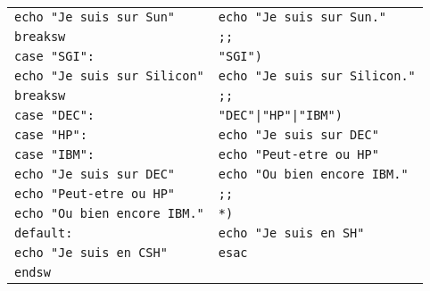 \begin{longtable}{|p{6.5cm}|p{6.5cm}|}
		\hspace{1cm}\verb,echo "Je suis sur Sun",		&
			\hspace{1cm}\verb,echo "Je suis sur Sun.",		\\
		\hspace{1cm}\verb,breaksw,						&
			\hspace{1cm}\verb,;;,							\\
		\hspace{0.5cm}\verb,case "SGI":,				&
			\hspace{0.5cm}\verb,"SGI"),						\\
		\hspace{1cm}\verb,echo "Je suis sur Silicon",	&
			\hspace{1cm}\verb,echo "Je suis sur Silicon.",	\\
		\hspace{1cm}\verb,breaksw,						&
			\hspace{1cm}\verb,;;,							\\
		\hspace{0.5cm}\verb,case "DEC":,				&
			\hspace{0.5cm}\verb,"DEC"|"HP"|"IBM"),			\\
		\hspace{0.5cm}\verb,case "HP":,					&
			\hspace{1cm}\verb,echo "Je suis sur DEC",		\\
		\hspace{0.5cm}\verb,case "IBM":,				&
			\hspace{1cm}\verb,echo "Peut-etre ou HP",		\\
		\hspace{1cm}\verb,echo "Je suis sur DEC",		&
			\hspace{1cm}\verb,echo "Ou bien encore IBM.",	\\
		\hspace{1cm}\verb,echo "Peut-etre ou HP",		&
			\hspace{1cm}\verb,;;,							\\
		\hspace{1cm}\verb,echo "Ou bien encore IBM.",	&
			\hspace{0.5cm}\verb,*),							\\
		\hspace{0.5cm}\verb,default:,					&
			\hspace{1cm}\verb,echo "Je suis en SH",			\\
		\hspace{1cm}\verb,echo "Je suis en CSH",		&
			\verb,esac,										\\
		\verb,endsw,									&	\\
\end{longtable}


